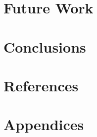 \documentclass[12pt]{report}
\begin{document}
\chapter{Future Work}


\chapter{Conclusions}




\chapter{References}
\label{sec:ref}




\chapter{Appendices}

\end{document}
